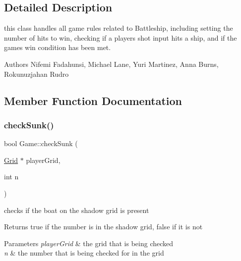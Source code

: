 \subsection{Detailed Description}
this class handles all game rules related to Battleship, including setting the number of hits to win, checking if a player\textquotesingle{}s shot input hits a ship, and if the game\textquotesingle{}s win condition has been met. 

\begin{DoxyAuthor}{Authors}
Nifemi Fadahunsi, Michael Lane, Yuri Martinez, Anna Burns, Rokunuzjahan Rudro 
\end{DoxyAuthor}


\subsection{Member Function Documentation}
\mbox{\label{classGame_ac1e0a9a0ab9253e5b31e32e86e824458}} 
\subsubsection{\texorpdfstring{check\+Sunk()}{checkSunk()}}
{\footnotesize\ttfamily bool Game\+::check\+Sunk (\begin{DoxyParamCaption}\item[{\hyperlink{classGrid}{Grid} $\ast$}]{player\+Grid,  }\item[{int}]{n }\end{DoxyParamCaption})}



checks if the boat on the shadow grid is present 

\begin{DoxyReturn}{Returns}
true if the number is in the shadow grid, false if it is not 
\end{DoxyReturn}

\begin{DoxyParams}{Parameters}
{\em player\+Grid} & the grid that is being checked \\
\hline
{\em n} & the number that is being checked for in the grid \\
\hline
\end{DoxyParams}
\mbox{\label{classGame_a53e176256e6d4962a37e0f22d6731fce}} 
